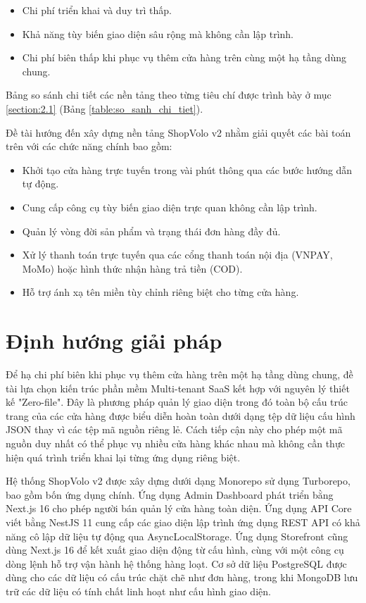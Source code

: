 \documentclass[../main.tex]{subfiles}
\begin{document}
\begin{itemize}
    \item Chi phí triển khai và duy trì thấp.
    \item Khả năng tùy biến giao diện sâu rộng mà không cần lập trình.
    \item Chi phí biên thấp khi phục vụ thêm cửa hàng trên cùng một hạ tầng dùng chung.
\end{itemize}

Bảng so sánh chi tiết các nền tảng theo từng tiêu chí được trình bày ở mục \ref{section:2.1} (Bảng \ref{table:so_sanh_chi_tiet}).

Đề tài hướng đến xây dựng nền tảng ShopVolo v2 nhằm giải quyết các bài toán trên với các chức năng chính bao gồm:

\begin{itemize}
    \item Khởi tạo cửa hàng trực tuyến trong vài phút thông qua các bước hướng dẫn tự động.
    \item Cung cấp công cụ tùy biến giao diện trực quan không cần lập trình.
    \item Quản lý vòng đời sản phẩm và trạng thái đơn hàng đầy đủ.
    \item Xử lý thanh toán trực tuyến qua các cổng thanh toán nội địa (VNPAY, MoMo) hoặc hình thức nhận hàng trả tiền (COD).
    \item Hỗ trợ ánh xạ tên miền tùy chỉnh riêng biệt cho từng cửa hàng.
\end{itemize}

\section{Định hướng giải pháp}
\label{section:1.3}

Để hạ chi phí biên khi phục vụ thêm cửa hàng trên một hạ tầng dùng chung, đề tài lựa chọn kiến trúc phần mềm Multi-tenant SaaS kết hợp với nguyên lý thiết kế "Zero-file". Đây là phương pháp quản lý giao diện trong đó toàn bộ cấu trúc trang của các cửa hàng được biểu diễn hoàn toàn dưới dạng tệp dữ liệu cấu hình JSON thay vì các tệp mã nguồn riêng lẻ. Cách tiếp cận này cho phép một mã nguồn duy nhất có thể phục vụ nhiều cửa hàng khác nhau mà không cần thực hiện quá trình triển khai lại từng ứng dụng riêng biệt.

Hệ thống ShopVolo v2 được xây dựng dưới dạng Monorepo sử dụng Turborepo, bao gồm bốn ứng dụng chính. Ứng dụng Admin Dashboard phát triển bằng Next.js 16 cho phép người bán quản lý cửa hàng toàn diện. Ứng dụng API Core viết bằng NestJS 11 cung cấp các giao diện lập trình ứng dụng REST API có khả năng cô lập dữ liệu tự động qua AsyncLocalStorage. Ứng dụng Storefront cũng dùng Next.js 16 để kết xuất giao diện động từ cấu hình, cùng với một công cụ dòng lệnh hỗ trợ vận hành hệ thống hàng loạt. Cơ sở dữ liệu PostgreSQL được dùng cho các dữ liệu có cấu trúc chặt chẽ như đơn hàng, trong khi MongoDB lưu trữ các dữ liệu có tính chất linh hoạt như cấu hình giao diện.
\end{document}
